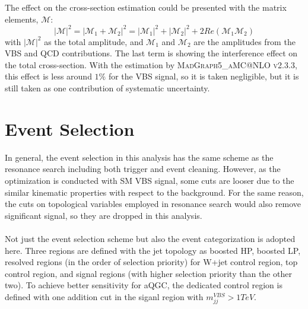 The effect on the cross-section estimation could be presented with the matrix elements, $\mathcal{M}$: 
\begin{equation}
|\mathcal{M}|^2=|\mathcal{M}_1+\mathcal{M}_2|^2 = |\mathcal{M}_1|^2+|\mathcal{M}_2|^2+2Re(\mathcal{M}_1\mathcal{M}_2)
\end{equation}
with $|\mathcal{M}|^2$ as the total amplitude, and $\mathcal{M}_1$ and $\mathcal{M}_2$ are the amplitudes from the VBS and QCD contributions. The last term is showing the interference effect on the total cross-section. With the estimation by \textsc{MadGraph5\_aMC@NLO v2.3.3}\cite{Alwall:2014hca}, this effect is less around $1\%$ for the VBS signal, so it is taken negligible, but it is still taken as one contribution of systematic uncertainty.
\section{Event Selection}
In general, the event selection in this analysis has the same scheme as the resonance search including both trigger and event cleaning. However, as the optimization is conducted with SM VBS signal, some cuts are looser due to the similar kinematic properties with respect to the background. For the same reason, the cuts on topological variables employed in resonance search would also remove significant signal, so they are dropped in this analysis.
\\
\\Not just the event selection scheme but also the event categorization is adopted here. Three regions are defined with the jet topology as boosted HP, boosted LP, resolved regions (in the order of selection priority) for W+jet control region, top control region, and signal regions (with higher selection priority than the other two). To achieve better sensitivity for aQGC, the dedicated control region is defined with one addition cut in the siganl region with $m^{VBS}_{jj}>1TeV$. 

